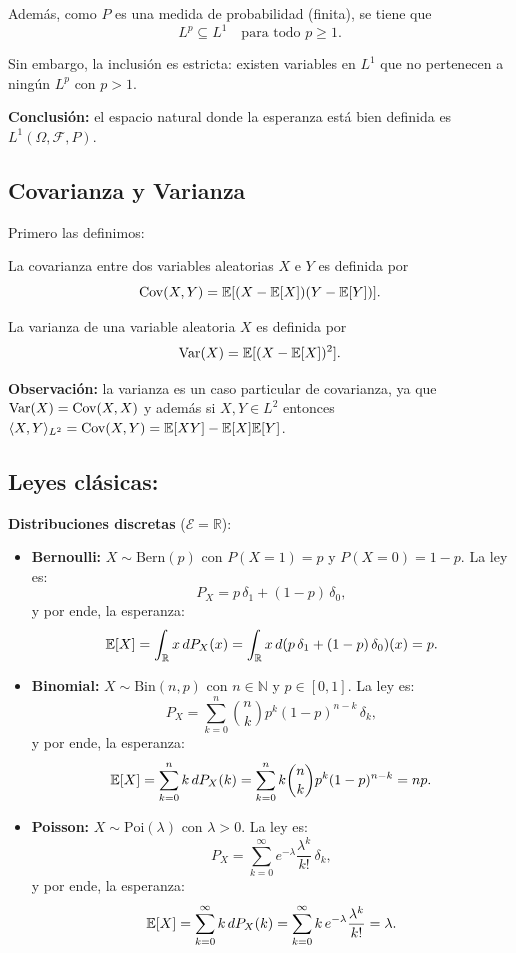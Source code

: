 Además, como $P$ es una medida de probabilidad (finita), se tiene que
\[
L^p \subseteq L^1 \quad \text{para todo } p \geq 1.
\]

Sin embargo, la inclusión es estricta: existen variables en $L^1$ que no pertenecen a ningún $L^p$ con $p > 1$.

\medskip

\noindent
\textbf{Conclusión:} el espacio natural donde la esperanza está bien definida es $L^1(\Omega,\mathcal{F},P)$.

\subsection{Covarianza y Varianza}

Primero las definimos:

\begin{defi}[Covarianza]
La covarianza entre dos variables aleatorias $X$ e $Y$ es definida por
\[  \mathrm{Cov}(X,Y) = \mathbb{E}[(X - \mathbb{E}[X])(Y - \mathbb{E}[Y])]. \]
\end{defi}    

\begin{defi}[Varianza]
La varianza de una variable aleatoria $X$ es definida por
\[  \mathrm{Var}(X) = \mathbb{E}[(X - \mathbb{E}[X])^2]. \]
\end{defi}    

\textbf{Observación:} la varianza es un caso particular de covarianza, ya que $\mathrm{Var}(X) = \mathrm{Cov}(X,X)$ y además si $X, Y \in L^2$ entonces $\langle X,Y\rangle_{L^2} = \mathrm{Cov}(X,Y) = \mathbb{E}[XY] - \mathbb{E}[X]\mathbb{E}[Y]$.

\subsection{Leyes clásicas:}

\textbf{Distribuciones discretas} ($\mathcal{E} = \mathbb{R}$):

\begin{itemize}
\item \textbf{Bernoulli:} $X \sim \text{Bern}(p)$ con $P(X=1) = p$ y $P(X=0) = 1-p$. La ley es:
\[
P_X = p\,\delta_1 + (1-p)\,\delta_0,
\]
y por ende, la esperanza:
\[
\mathbb{E}[X] = \int_{\mathbb{R}} x \, dP_X(x) = \int_{\mathbb{R}} x \, d(p\,\delta_1 + (1-p)\,\delta_0)(x) = p.
\]

\item \textbf{Binomial:} $X \sim \text{Bin}(n,p)$ con $n \in \mathbb{N}$ y $p \in [0,1]$. La ley es:
\[
P_X = \sum_{k=0}^{n} \binom{n}{k} p^k (1-p)^{n-k} \, \delta_k,
\]
y por ende, la esperanza:
\[
\mathbb{E}[X] = \sum_{k=0}^{n} k \, dP_X(k) = \sum_{k=0}^{n} k \binom{n}{k} p^k (1-p)^{n-k} = np.
\]

\item \textbf{Poisson:} $X \sim \text{Poi}(\lambda)$ con $\lambda > 0$. La ley es:
\[
P_X = \sum_{k=0}^{\infty} e^{-\lambda} \frac{\lambda^k}{k!} \, \delta_k,
\]
y por ende, la esperanza:
\[
\mathbb{E}[X] = \sum_{k=0}^{\infty} k \, dP_X(k) = \sum_{k=0}^{\infty} k \, e^{-\lambda} \frac{\lambda^k}{k!} = \lambda.
\]
\end{itemize}

